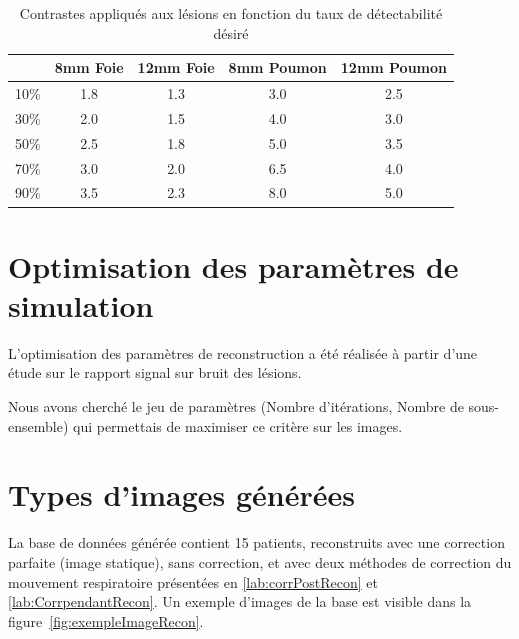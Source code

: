 \begin{table}

\centering

\begin{tabular}{|c||c|c||c|c|}
 \hline
	& 8mm Foie	& 12mm Foie	& 8mm Poumon	& 12mm Poumon	\\
\hline
10\%	& 1.8		& 1.3		& 3.0		& 2.5		\\
\hline
30\%	& 2.0		& 1.5		& 4.0		& 3.0		\\
\hline
50\%	& 2.5		& 1.8		& 5.0		& 3.5		\\
\hline
70\%	& 3.0		& 2.0		& 6.5		& 4.0		\\
\hline
90\%	& 3.5		& 2.3		& 8.0		& 5.0		\\
\hline
\end{tabular}
\caption[Contraste final lésions du foie et du poumon]{Contrastes appliqués aux lésions en fonction du taux de détectabilité désiré}
\label{tab:contrasteFoieFinal}
\end{table}



\section{Optimisation des paramètres de simulation}

L'optimisation des paramètres de reconstruction a été réalisée à partir d'une étude sur le rapport signal sur bruit des lésions.

Nous avons cherché le jeu de paramètres (Nombre d'itérations, Nombre de sous-ensemble) qui permettais de maximiser ce critère sur les images.

\section{Types d'images générées}

La base de données générée contient 15 patients, reconstruits avec une correction parfaite (image statique), sans correction, et avec deux méthodes de correction du mouvement respiratoire présentées en \ref{lab:corrPostRecon} et \ref{lab:CorrpendantRecon}. Un exemple d'images de la base est visible dans la figure~\ref{fig:exempleImageRecon}.

